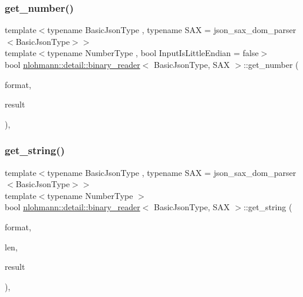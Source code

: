 \subsubsection{\texorpdfstring{get\_number()}{get\_number()}}
{\footnotesize\ttfamily template$<$typename Basic\+Json\+Type , typename S\+AX  = json\+\_\+sax\+\_\+dom\+\_\+parser$<$\+Basic\+Json\+Type$>$$>$ \\
template$<$typename Number\+Type , bool Input\+Is\+Little\+Endian = false$>$ \\
bool \mbox{\hyperlink{classnlohmann_1_1detail_1_1binary__reader}{nlohmann\+::detail\+::binary\+\_\+reader}}$<$ Basic\+Json\+Type, S\+AX $>$\+::get\+\_\+number (\begin{DoxyParamCaption}\item[{const \mbox{\hyperlink{namespacenlohmann_1_1detail_aa554fc6a11519e4f347deb25a9f0db40}{input\+\_\+format\+\_\+t}}}]{format,  }\item[{Number\+Type \&}]{result }\end{DoxyParamCaption})\hspace{0.3cm}{\ttfamily [inline]}, {\ttfamily [private]}}

\mbox{\label{classnlohmann_1_1detail_1_1binary__reader_a1f4b5da029a561c8711426b0a7316ec6}} 
\subsubsection{\texorpdfstring{get\_string()}{get\_string()}}
{\footnotesize\ttfamily template$<$typename Basic\+Json\+Type , typename S\+AX  = json\+\_\+sax\+\_\+dom\+\_\+parser$<$\+Basic\+Json\+Type$>$$>$ \\
template$<$typename Number\+Type $>$ \\
bool \mbox{\hyperlink{classnlohmann_1_1detail_1_1binary__reader}{nlohmann\+::detail\+::binary\+\_\+reader}}$<$ Basic\+Json\+Type, S\+AX $>$\+::get\+\_\+string (\begin{DoxyParamCaption}\item[{const \mbox{\hyperlink{namespacenlohmann_1_1detail_aa554fc6a11519e4f347deb25a9f0db40}{input\+\_\+format\+\_\+t}}}]{format,  }\item[{const Number\+Type}]{len,  }\item[{\mbox{\hyperlink{classnlohmann_1_1detail_1_1binary__reader_aa0b9729917ca7ee6ed01e3792341316e}{string\+\_\+t}} \&}]{result }\end{DoxyParamCaption})\hspace{0.3cm}{\ttfamily [inline]}, {\ttfamily [private]}}



